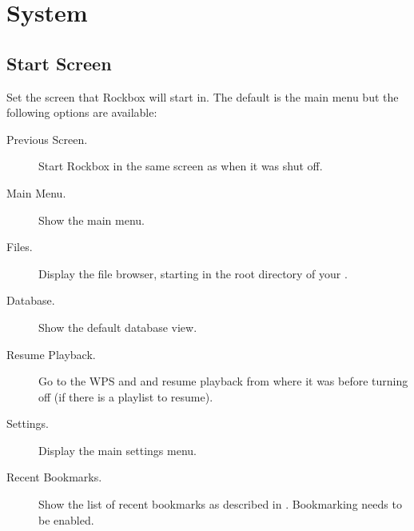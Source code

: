 \section{\label{ref:SystemOptions}System}
\subsection{Start Screen}
    Set the screen that Rockbox will start in. The default is the main menu but
    the following options are available: %
    \begin{description}
        \item[Previous Screen.] Start Rockbox in the same screen as when it was shut off.
        \item[Main Menu.] Show the main menu.
        \item[Files.] Display the file browser, starting in the root directory of your \dap.
        \item[Database.] Show the default database view.
        \item[Resume Playback.] Go to the WPS and and resume playback from where it was
            before turning off (if there is a playlist to resume).
        \item[Settings.] Display the main settings menu.
        \item[Recent Bookmarks.] Show the list of recent bookmarks as
            described in . Bookmarking needs
            to be enabled.
    \end{description}

